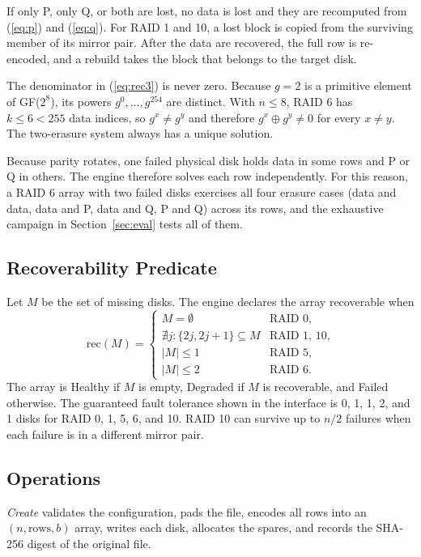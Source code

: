 \documentclass{ieeeaccess}
\begin{document}
If only P, only Q, or both are lost, no data is lost and they are recomputed from (\ref{eq:p}) and (\ref{eq:q}). For RAID 1 and 10, a lost block is copied from the surviving member of its mirror pair. After the data are recovered, the full row is re-encoded, and a rebuild takes the block that belongs to the target disk.

The denominator in (\ref{eq:rec3}) is never zero. Because $g=2$ is a primitive element of GF($2^8$), its powers $g^0,\dots,g^{254}$ are distinct. With $n \le 8$, RAID 6 has $k \le 6 < 255$ data indices, so $g^x \ne g^y$ and therefore $g^x \oplus g^y \ne 0$ for every $x \ne y$. The two-erasure system always has a unique solution.

Because parity rotates, one failed physical disk holds data in some rows and P or Q in others. The engine therefore solves each row independently. For this reason, a RAID 6 array with two failed disks exercises all four erasure cases (data and data, data and P, data and Q, P and Q) across its rows, and the exhaustive campaign in Section~\ref{sec:eval} tests all of them.

\subsection{Recoverability Predicate}
\label{sec:pred}
Let $M$ be the set of missing disks. The engine declares the array recoverable when \begin{equation} \text{rec}(M) = \begin{cases} M = \emptyset & \text{RAID 0},\\ \nexists j : \{2j, 2j+1\} \subseteq M & \text{RAID 1, 10},\\ |M| \le 1 & \text{RAID 5},\\ |M| \le 2 & \text{RAID 6}. \end{cases} \label{eq:pred} \end{equation} The array is Healthy if $M$ is empty, Degraded if $M$ is recoverable, and Failed otherwise. The guaranteed fault tolerance shown in the interface is 0, 1, 1, 2, and 1 disks for RAID 0, 1, 5, 6, and 10. RAID 10 can survive up to $n/2$ failures when each failure is in a different mirror pair.

\subsection{Operations}
\emph{Create} validates the configuration, pads the file, encodes all rows into an $(n, \text{rows}, b)$ array, writes each disk, allocates the spares, and records the SHA-256 digest of the original file.
\end{document}
